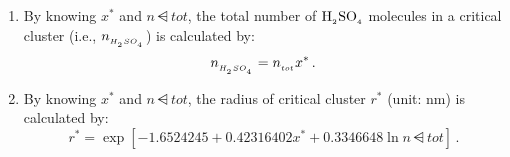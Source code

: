 \begin{enumerate}
\item By knowing $x^*$ and $n\dsub{tot}$, the total number of $\rm H_{_2}SO_{_4}$
molecules in a critical cluster (i.e., $n_{_{H_{_2}SO_{_4}}}$) is calculated by:
%
\begin{equation}
n_{_{H_{_2}SO_{_4}}} = n_{_{tot}} x^* \,.
\end{equation}
%
\item By knowing $x^*$ and $n\dsub{tot}$, the radius of critical cluster
$r^*$ (unit: nm) is calculated by:
%
\begin{equation}
r^* = \exp \left[ -1.6524245 + 0.42316402 x^* +
        0.3346648 \ln n\dsub{tot} \right] \,.
\end{equation}
%
\end{enumerate}

